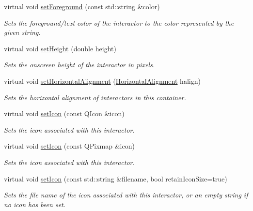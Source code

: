 \begin{DoxyCompactItemize}
virtual void \mbox{\hyperlink{classsgl_1_1GInteractor_af59209aeadea6dfc6d97a2d8531f50e1}{set\+Foreground}} (const std\+::string \&color)
\begin{DoxyCompactList}\small\item\em Sets the foreground/text color of the interactor to the color represented by the given string. \end{DoxyCompactList}\item 
virtual void \mbox{\hyperlink{classsgl_1_1GInteractor_a9e280bfc4544dfaf8e4376c4e1a74357}{set\+Height}} (double height)
\begin{DoxyCompactList}\small\item\em Sets the onscreen height of the interactor in pixels. \end{DoxyCompactList}\item 
virtual void \mbox{\hyperlink{classsgl_1_1GContainer_a901653aacb9991ee9a8b70d4a932f0c9}{set\+Horizontal\+Alignment}} (\mbox{\hyperlink{namespacesgl_aa00e70829e72ff16addc4d9f06fe3bc5}{Horizontal\+Alignment}} halign)
\begin{DoxyCompactList}\small\item\em Sets the horizontal alignment of interactors in this container. \end{DoxyCompactList}\item 
virtual void \mbox{\hyperlink{classsgl_1_1GInteractor_a542abfcd7261751352af129c7215ecda}{set\+Icon}} (const Q\+Icon \&icon)
\begin{DoxyCompactList}\small\item\em Sets the icon associated with this interactor. \end{DoxyCompactList}\item 
virtual void \mbox{\hyperlink{classsgl_1_1GInteractor_a368e1a338f84401c284506d03b1ba769}{set\+Icon}} (const Q\+Pixmap \&icon)
\begin{DoxyCompactList}\small\item\em Sets the icon associated with this interactor. \end{DoxyCompactList}\item 
virtual void \mbox{\hyperlink{classsgl_1_1GInteractor_a762e139aa311461c3984d3ad28293f64}{set\+Icon}} (const std\+::string \&filename, bool retain\+Icon\+Size=true)
\begin{DoxyCompactList}\small\item\em Sets the file name of the icon associated with this interactor, or an empty string if no icon has been set. \end{DoxyCompactList}\item 

\end{DoxyCompactItemize}
